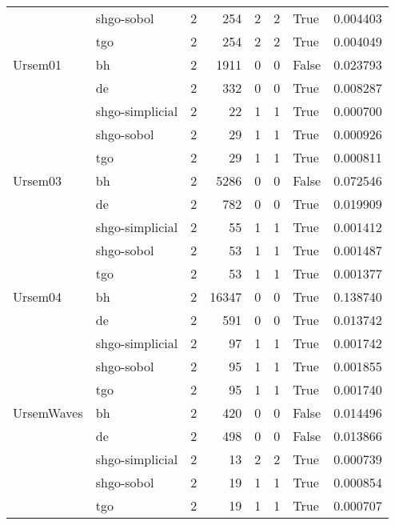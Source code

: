 \begin{longtable}{llrrrrlr}
         & shgo-sobol &     2 &      254 &      2 &       2 &    True &    0.004403 \\
         & tgo &     2 &      254 &      2 &       2 &    True &    0.004049 \\
Ursem01 & bh &     2 &     1911 &      0 &       0 &   False &    0.023793 \\
         & de &     2 &      332 &      0 &       0 &    True &    0.008287 \\
         & shgo-simplicial &     2 &       22 &      1 &       1 &    True &    0.000700 \\
         & shgo-sobol &     2 &       29 &      1 &       1 &    True &    0.000926 \\
         & tgo &     2 &       29 &      1 &       1 &    True &    0.000811 \\
Ursem03 & bh &     2 &     5286 &      0 &       0 &   False &    0.072546 \\
         & de &     2 &      782 &      0 &       0 &    True &    0.019909 \\
         & shgo-simplicial &     2 &       55 &      1 &       1 &    True &    0.001412 \\
         & shgo-sobol &     2 &       53 &      1 &       1 &    True &    0.001487 \\
         & tgo &     2 &       53 &      1 &       1 &    True &    0.001377 \\
Ursem04 & bh &     2 &    16347 &      0 &       0 &    True &    0.138740 \\
         & de &     2 &      591 &      0 &       0 &    True &    0.013742 \\
         & shgo-simplicial &     2 &       97 &      1 &       1 &    True &    0.001742 \\
         & shgo-sobol &     2 &       95 &      1 &       1 &    True &    0.001855 \\
         & tgo &     2 &       95 &      1 &       1 &    True &    0.001740 \\
UrsemWaves & bh &     2 &      420 &      0 &       0 &   False &    0.014496 \\
         & de &     2 &      498 &      0 &       0 &   False &    0.013866 \\
         & shgo-simplicial &     2 &       13 &      2 &       2 &    True &    0.000739 \\
         & shgo-sobol &     2 &       19 &      1 &       1 &    True &    0.000854 \\
         & tgo &     2 &       19 &      1 &       1 &    True &    0.000707 \\

\end{longtable}
